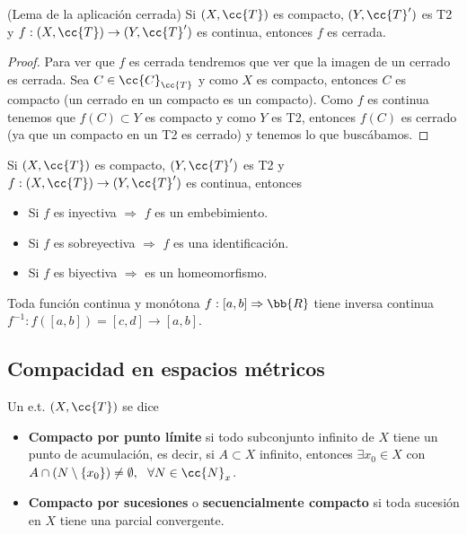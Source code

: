 \begin{prop}
    (Lema de la aplicación cerrada) Si $(X, \cc{T})$ es compacto, $(Y, \cc{T}')$ es T2 y $f:(X, \cc{T})\to (Y, \cc{T}')$ es continua, entonces $f$ es cerrada.
    \begin{proof}
        Para ver que $f$ es cerrada tendremos que ver que la imagen de un cerrado es cerrada. Sea $C\in \cc{C}_{\cc{T}}$ y como $X$ es compacto, entonces $C$ es compacto (un cerrado en un compacto es un compacto). Como $f$ es continua tenemos que $f(C)\subset Y$ es compacto y como $Y$ es T2, entonces $f(C)$ es cerrado (ya que un compacto en un T2 es cerrado) y tenemos lo que buscábamos.

    \end{proof}
\end{prop}

\begin{coro}
    Si $(X, \cc{T})$ es compacto, $(Y, \cc{T}')$ es T2 y $f:(X, \cc{T})\to (Y, \cc{T}')$ es continua, entonces 
    \begin{itemize}
        \item Si $f$ es inyectiva $\Rightarrow$ $f$ es un embebimiento.
        \item Si $f$ es sobreyectiva $\Rightarrow$ $f$ es una identificación.
        \item Si $f$ es biyectiva $\Rightarrow$ es un homeomorfismo.
    \end{itemize}
    \endsquare
\end{coro}

\begin{ejemplo}
    Toda función continua y monótona $f:[a,b]\Rightarrow \bb{R}$ tiene inversa continua $f^{-1}:f([a,b])=[c,d] \to [a,b]$.
    \endsquare
\end{ejemplo}

\subsection{Compacidad en espacios métricos}

\begin{definicion}
    Un e.t. $(X, \cc{T})$ se dice
    \begin{itemize}
        \item \textbf{Compacto por punto límite} si todo subconjunto infinito de $X$ tiene un punto de acumulación, es decir, si $A\subset X$ infinito, entonces $\exists x_0\in X$ con $A\cap(N\setminus\{x_0\})\neq \emptyset,\ \ \forall N\in \cc{N}_x$.
        \item \textbf{Compacto por sucesiones} o \textbf{secuencialmente compacto} si toda sucesión en $X$ tiene una parcial convergente. 
    \end{itemize}
    \endsquare
\end{definicion}

